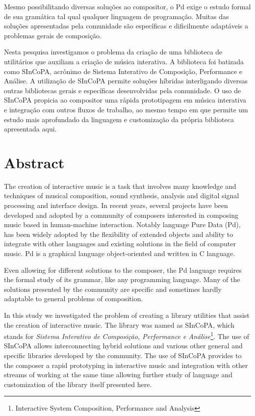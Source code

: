 \documentclass[draft]{ppgmus}
\begin{document}
Mesmo possibilitando diversas soluções ao compositor, o Pd exige
o estudo formal de sua gramática tal qual qualquer linguagem de 
programação. Muitas das soluções apresentadas pela comunidade
são específicas e dificilmente adaptáveis a problemas gerais de 
composição.

Nesta pesquisa investigamos o problema da criação de uma biblioteca
de utilitários que auxiliam a criação de música interativa. 
A biblioteca foi batizada como SInCoPA, acrônimo de Sistema Interativo
de Composição, Performance e Análise.
A utilização de SInCoPA permite
soluções híbridas interligando diversas outras bibliotecas gerais e
específicas desenvolvidas pela comunidade. O uso de SInCoPA
propicia ao compositor uma rápida prototipagem em música interativa e 
integração com outros fluxos de trabalho, ao mesmo tempo em que permite
um estudo mais aprofundado da linguagem e customização da própria biblioteca
apresentada aqui.



\chapter*{Abstract}
\label{cha:abstract}

The creation of interactive music is a task that involves many
knowledge and techniques of musical composition, sound synthesis,
analysis and digital signal processing and interface design.
In recent years, several projects have been developed and adopted by a
community of composers interested in composing music based
in human-machine interaction. Notably language Pure Data (Pd),
has been widely adopted by the flexibility of extended objects
and ability to integrate with other languages ​​and existing solutions
in the field of computer music. Pd is a graphical language object-oriented
and written in C language.

Even allowing for different solutions to the composer, the Pd language requires
the formal study of its grammar, like any programming language. 
Many of the solutions presented by the community
are specific and sometimes hardly adaptable to general problems of
composition.

In this study we investigated the problem of creating a library
utilities that assist the creation of interactive music.
The library was named as SInCoPA, which stands for \textit{Sistema Interativo
de Composição, Performance e Análise}\footnote{Interactive System
Composition, Performance and Analysis}.
The use of SInCoPA allows
interconnecting hybrid solutions and various other general and specific libraries
 developed by the community. The use of SInCoPA
 provides to the composer a rapid prototyping in interactive music and
integration with other streams of working at the same time allowing
further study of language and customization of the library itself
presented here.
\end{document}
